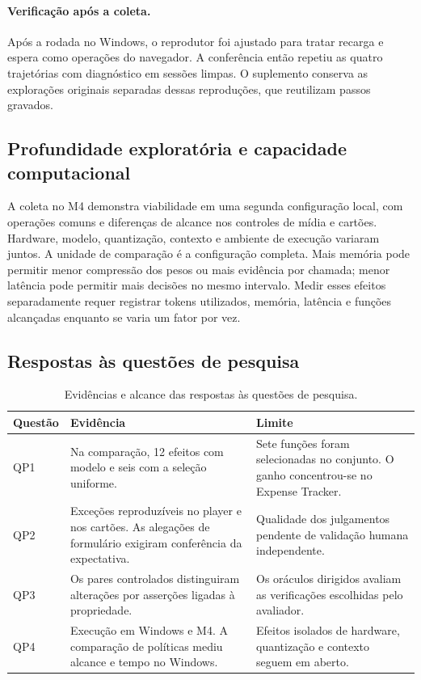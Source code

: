 \documentclass[12pt]{article}
\begin{document}
\paragraph{Verificação após a coleta.} Após a rodada no Windows, o reprodutor foi ajustado para tratar recarga e espera como operações do navegador. A conferência então repetiu as quatro trajetórias com diagnóstico em sessões limpas. O suplemento conserva as explorações originais separadas dessas reproduções, que reutilizam passos gravados.

\subsection{Profundidade exploratória e capacidade computacional}\label{sec:depth}
A coleta no M4 demonstra viabilidade em uma segunda configuração local, com operações comuns e diferenças de alcance nos controles de mídia e cartões. Hardware, modelo, quantização, contexto e ambiente de execução variaram juntos. A unidade de comparação é a configuração completa. Mais memória pode permitir menor compressão dos pesos ou mais evidência por chamada; menor latência pode permitir mais decisões no mesmo intervalo. Medir esses efeitos separadamente requer registrar tokens utilizados, memória, latência e funções alcançadas enquanto se varia um fator por vez.

\subsection{Respostas às questões de pesquisa}
\begin{table}[ht]
\centering\small
\caption{Evidências e alcance das respostas às questões de pesquisa.}
\begin{tabular}{l>{\raggedright\arraybackslash}p{5.8cm}>{\raggedright\arraybackslash}p{5.5cm}}
\toprule
Questão & Evidência & Limite \\
\midrule
QP1 & Na comparação, 12 efeitos com modelo e seis com a seleção uniforme. & Sete funções foram selecionadas no conjunto. O ganho concentrou-se no Expense Tracker. \\
QP2 & Exceções reproduzíveis no player e nos cartões. As alegações de formulário exigiram conferência da expectativa. & Qualidade dos julgamentos pendente de validação humana independente. \\
QP3 & Os pares controlados distinguiram alterações por asserções ligadas à propriedade. & Os oráculos dirigidos avaliam as verificações escolhidas pelo avaliador. \\
QP4 & Execução em Windows e M4. A comparação de políticas mediu alcance e tempo no Windows. & Efeitos isolados de hardware, quantização e contexto seguem em aberto. \\
\bottomrule
\end{tabular}
\end{table}
\end{document}

